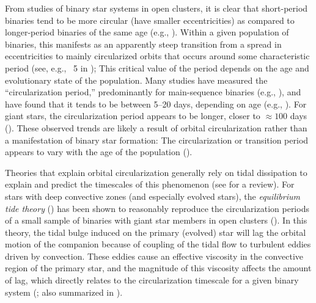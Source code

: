 \documentclass[modern, letterpaper]{aastex62}
\begin{document}
From studies of binary star systems in open clusters, it is clear that
short-period binaries tend to be more circular (have smaller eccentricities) as
compared to longer-period binaries of the same age (e.g.,
\citealt{Mathieu:2005}).
Within a given population of binaries, this manifests as an apparently steep
transition from a spread in eccentricities to mainly circularized orbits
that occurs around some characteristic period (see, e.g., \figurename~5 in
\citealt{Mathieu:2005});
This critical value of the period depends on the age and evolutionary state of
the population.
Many studies have measured the ``circularization period,'' predominantly for
main-sequence binaries (e.g., \citealt{Meibom:2006, Kjurkchieva:2017}), and have
found that it tends to be between 5--20 days, depending on age (e.g.,
\citealt{Mathieu:1988}).
For giant stars, the circularization period appears to be longer, closer to
$\approx 100$ days (\citealt{Mayor:1984}).
These observed trends are likely a result of orbital circularization rather than
a manifestation of binary star formation: The circularization or transition
period appears to vary with the age of the population (\citealt{Meibom:2005}).

Theories that explain orbital circularization generally rely on tidal
dissipation to explain and predict the timescales of this phenomenon (see
\citealt{Mazeh:2007hp} for a review).
For stars with deep convective zones (and especially evolved stars), the
\emph{equilibrium tide theory} (\citealt{Zahn:1977, Zahn:1989}) has been shown
to reasonably reproduce the circularization periods of a small sample of
binaries with giant star members in open clusters (\citealt{Verbunt:1995}).
In this theory, the tidal bulge induced on the primary (evolved) star will lag
the orbital motion of the companion because of coupling of the tidal flow to
turbulent eddies driven by convection.
These eddies cause an effective viscosity in the convective region of the
primary star, and the magnitude of this viscosity affects the amount of lag,
which directly relates to the circularization timescale for a given binary
system (\citealt{Zahn:1989}; also summarized in \citealt{Goodman:1997}).
\end{document}
